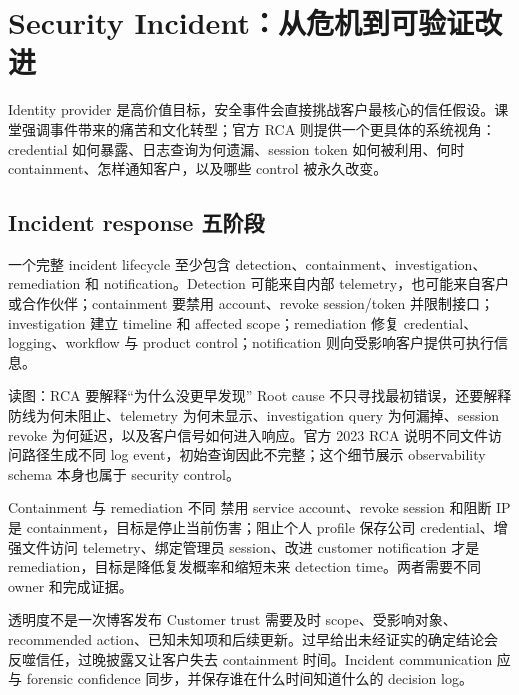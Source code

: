 \section{Security Incident：从危机到可验证改进}

Identity provider 是高价值目标，安全事件会直接挑战客户最核心的信任假设。课堂强调事件带来的痛苦和文化转型；官方 RCA 则提供一个更具体的系统视角：credential 如何暴露、日志查询为何遗漏、session token 如何被利用、何时 containment、怎样通知客户，以及哪些 control 被永久改变。

\subsection{Incident response 五阶段}

一个完整 incident lifecycle 至少包含 detection、containment、investigation、remediation 和 notification。Detection 可能来自内部 telemetry，也可能来自客户或合作伙伴；containment 要禁用 account、revoke session/token 并限制接口；investigation 建立 timeline 和 affected scope；remediation 修复 credential、logging、workflow 与 product control；notification 则向受影响客户提供可执行信息。


\begin{knowledgebox}{读图：RCA 要解释“为什么没更早发现”}
Root cause 不只寻找最初错误，还要解释防线为何未阻止、telemetry 为何未显示、investigation query 为何漏掉、session revoke 为何延迟，以及客户信号如何进入响应。官方 2023 RCA 说明不同文件访问路径生成不同 log event，初始查询因此不完整；这个细节展示 observability schema 本身也属于 security control。
\end{knowledgebox}

\begin{importantbox}{Containment 与 remediation 不同}
禁用 service account、revoke session 和阻断 IP 是 containment，目标是停止当前伤害；阻止个人 profile 保存公司 credential、增强文件访问 telemetry、绑定管理员 session、改进 customer notification 才是 remediation，目标是降低复发概率和缩短未来 detection time。两者需要不同 owner 和完成证据。
\end{importantbox}

\begin{warningbox}{透明度不是一次博客发布}
Customer trust 需要及时 scope、受影响对象、recommended action、已知未知项和后续更新。过早给出未经证实的确定结论会反噬信任，过晚披露又让客户失去 containment 时间。Incident communication 应与 forensic confidence 同步，并保存谁在什么时间知道什么的 decision log。
\end{warningbox}

